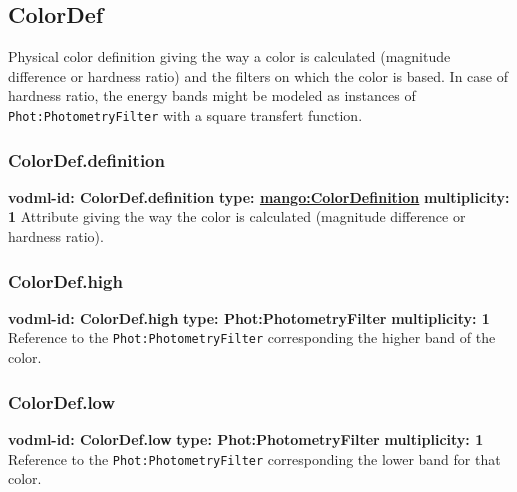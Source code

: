   \subsection{ColorDef}
    \label{sect:ColorDef}
    Physical color definition giving the way a color is calculated (magnitude difference or hardness ratio) and the filters on which the color is based. In case of hardness ratio, the energy bands might be modeled as instances of \texttt{Phot:PhotometryFilter} with a square transfert function.

    \subsubsection{ColorDef.definition}
    \textbf{vodml-id: ColorDef.definition} \newline
    \textbf{type: \hyperref[sect:ColorDefinition]{mango:ColorDefinition}} \newline
    \textbf{multiplicity: 1} \newline
    Attribute giving the way the color is calculated (magnitude difference or hardness ratio).

    \subsubsection{ColorDef.high}
    \textbf{vodml-id: ColorDef.high} \newline
    \textbf{type: Phot:PhotometryFilter} \newline
    \textbf{multiplicity: 1} \newline
    Reference to the \texttt{Phot:PhotometryFilter} \citep{2022ivoa.spec.1101S} corresponding the higher band of the color.

    \subsubsection{ColorDef.low}
    \textbf{vodml-id: ColorDef.low} \newline
    \textbf{type: Phot:PhotometryFilter} \newline
    \textbf{multiplicity: 1} \newline
    Reference to the \texttt{Phot:PhotometryFilter} corresponding the lower band for that color.


